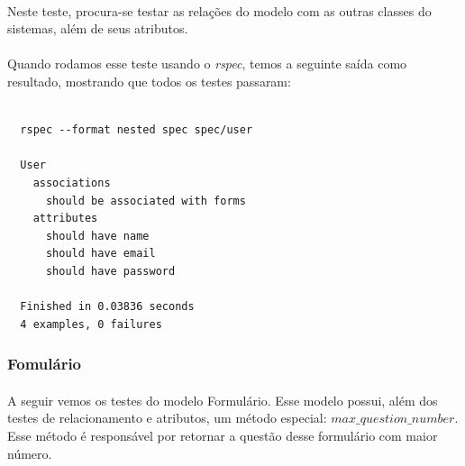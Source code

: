 \documentclass[11pt]{article}
\begin{document}
    \paragraph{}
    
    Neste teste, procura-se testar as relações do modelo com as outras 
    classes do sistemas, além de seus atributos.
    
    \paragraph{}
    Quando rodamos esse teste usando o {\em rspec}, temos a seguinte saída
    como resultado, mostrando que todos os testes passaram:
    
    {\scriptsize
      \lstset{language=sh}
      \begin{lstlisting}

  rspec --format nested spec spec/user

  User
    associations
      should be associated with forms
    attributes
      should have name
      should have email
      should have password

  Finished in 0.03836 seconds
  4 examples, 0 failures

      \end{lstlisting}
    }
        
  \clearpage
    
    \subsubsection{Fomulário}
      
    \paragraph{}
    A seguir vemos os testes do modelo Formulário. Esse modelo possui, além
    dos testes de relacionamento e atributos, um método especial: $max\_question\_number$. 
    \\Esse método é responsável por retornar a questão desse formulário com maior número. 
    
\end{document}
